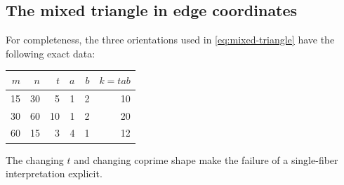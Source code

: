 \subsection{The mixed triangle in edge coordinates}

For completeness, the three orientations used in
\eqref{eq:mixed-triangle} have the following exact data:
\begin{center}
\begin{tabular}{rrrrrr}
\toprule
$m$&$n$&$t$&$a$&$b$&$k=tab$\\
\midrule
15&30&5&1&2&10\\
30&60&10&1&2&20\\
60&15&3&4&1&12\\
\bottomrule
\end{tabular}
\end{center}
The changing $t$ and changing coprime shape make the failure of a
single-fiber interpretation explicit.

